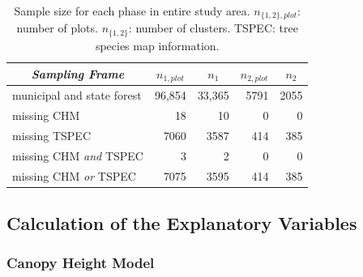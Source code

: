 \documentclass[remotesensing,article,accept,moreauthors,pdftex,10pt,a4paper]{Definitions/mdpi}
\begin{document}
\begin{table}[H]
	\begin{center}
		\caption{Sample size for each phase in entire study area. $n_{\{1,2\},plot}$: number of plots. $n_{\{1,2\}}$: number of clusters. TSPEC: tree species map information.}
	 
		\label{tab:ssize}
		{\small %
			\begin{tabular}{lrrrr}%
				\toprule
				\multicolumn{1}{c}{\textit{\textbf{Sampling Frame}}} & \multicolumn{1}{c}{\boldmath\textbf{$n_{1,plot}$}}  & \multicolumn{1}{c}{\boldmath\textbf{$n_1$}}  & \multicolumn{1}{c}{\boldmath\textbf{$n_{2,plot}$}}  & \multicolumn{1}{c}{\boldmath\textbf{$n_2$}} \\ %
				\midrule
				municipal and state forest & 96,854 & 33,365 & 5791 & 2055\\
				\hspace{5mm}  missing CHM &18 &  10 &  0 &  0\\ %
				\hspace{5mm}  missing TSPEC &7060  &  3587 &  414 &  385\\ %
				\hspace{5mm}  missing CHM \textit{and} TSPEC &  3 & 2 &  0 & 0\\ %
				\hspace{5mm}  missing CHM \textit{or} TSPEC &  7075 &  3595 &  414 &  385\\ %
				\bottomrule
			\end{tabular}
		} %
	\end{center}
\end{table}


\subsection{Calculation of the Explanatory Variables}
\label{sec:expvarcalc}
\vspace{-6pt}
\subsubsection{Canopy Height Model}
\end{document}
